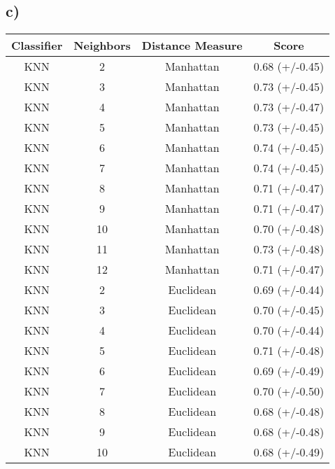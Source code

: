 \documentclass{article}
\begin{document}
      \subsection{c)}
        \begin{tabular}{cccc}
          \toprule
          Classifier &  Neighbors & Distance Measure &           Score \\
          \midrule
          KNN &          2 &              Manhattan &  0.68 (+/-0.45) \\
          KNN &          3 &              Manhattan &  0.73 (+/-0.45) \\
          KNN &          4 &              Manhattan &  0.73 (+/-0.47) \\
          KNN &          5 &              Manhattan &  0.73 (+/-0.45) \\
          KNN &          6 &              Manhattan &  0.74 (+/-0.45) \\
          KNN &          7 &              Manhattan &  0.74 (+/-0.45) \\
          KNN &          8 &              Manhattan &  0.71 (+/-0.47) \\
          KNN &          9 &              Manhattan &  0.71 (+/-0.47) \\
          KNN &         10 &              Manhattan &  0.70 (+/-0.48) \\
          KNN &         11 &              Manhattan &  0.73 (+/-0.48) \\
          KNN &         12 &              Manhattan &  0.71 (+/-0.47) \\
          KNN &          2 &              Euclidean &  0.69 (+/-0.44) \\
          KNN &          3 &              Euclidean &  0.70 (+/-0.45) \\
          KNN &          4 &              Euclidean &  0.70 (+/-0.44) \\
          KNN &          5 &              Euclidean &  0.71 (+/-0.48) \\
          KNN &          6 &              Euclidean &  0.69 (+/-0.49) \\
          KNN &          7 &              Euclidean &  0.70 (+/-0.50) \\
          KNN &          8 &              Euclidean &  0.68 (+/-0.48) \\
          KNN &          9 &              Euclidean &  0.68 (+/-0.48) \\
          KNN &         10 &              Euclidean &  0.68 (+/-0.49) \\

\end{tabular}
\end{document}
